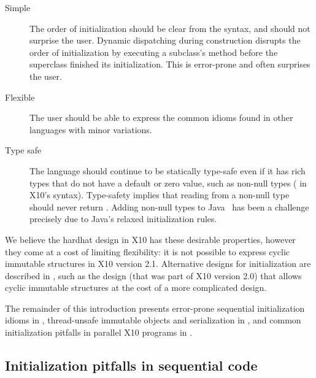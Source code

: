\begin{description}

  \item[Simple]
    The order of initialization should be clear from the syntax, %
        and should not surprise the user.
    Dynamic dispatching during construction disrupts the order
        of initialization by executing a subclass's method before the superclass finished its initialization.
    This is error-prone and often surprises the user.

  \item[Flexible]
    The user should be able to express the common idioms
        found in other languages with minor variations.

  \item[Type safe]
    The language should continue to be statically type-safe even
        if it has rich types that do not have a default or zero value,
        such as non-null types ( in X10's syntax).
    Type-safety implies that reading from a non-null type should never return .
    Adding non-null types to Java~\cite{Fahndrich:2003:DCN:949305.949332,Fahndrich:2007:EOI:1297027.1297052,XinQi:2009}
        has been a challenge precisely due to
        Java's relaxed initialization rules.
\end{description}

We believe the hardhat design in X10 has these desirable properties,
    however they come at a cost of limiting flexibility:
    it is not possible to express cyclic immutable structures in X10 version 2.1.
Alternative designs for initialization are described in ,
    such as the  design (that was part of X10 version 2.0) that allows cyclic immutable structures
    at the cost of a more complicated design.

The remainder of this introduction
    presents error-prone sequential initialization idioms in ,
    thread-unsafe immutable objects and serialization in , and
    common initialization pitfalls in parallel X10 programs in .

\subsection{Initialization pitfalls in sequential code}
\label{Section:Initialization-pitfalls}

